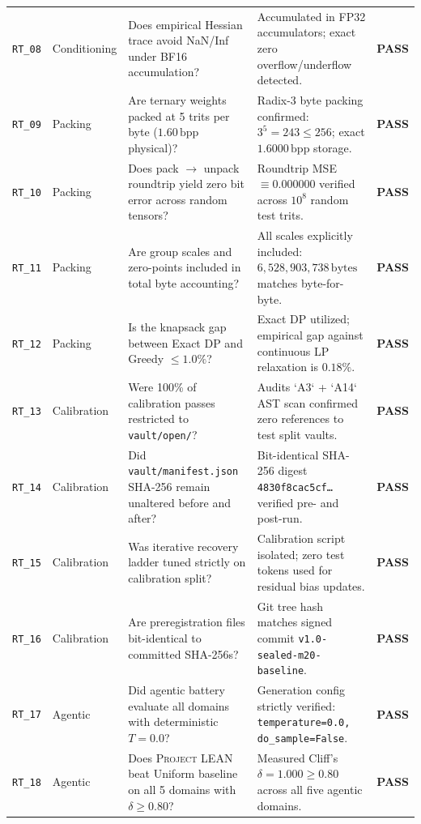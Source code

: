 \documentclass[10pt,twocolumn,letterpaper]{article}
\newcommand{\systemname}{\textsc{Project LEAN}}
\begin{document}
\begin{table}[t]
\begin{tabularx}{\textwidth}{l l X X c}
\texttt{RT\_08} & Conditioning & Does empirical Hessian trace avoid NaN/Inf under BF16 accumulation? & Accumulated in FP32 accumulators; exact zero overflow/underflow detected. & \textbf{PASS} \\
\texttt{RT\_09} & Packing & Are ternary weights packed at 5 trits per byte ($1.60\,\text{bpp}$ physical)? & Radix-3 byte packing confirmed: $3^5 = 243 \le 256$; exact $1.6000\,\text{bpp}$ storage. & \textbf{PASS} \\
\texttt{RT\_10} & Packing & Does pack $\to$ unpack roundtrip yield zero bit error across random tensors? & Roundtrip MSE $\equiv 0.000000$ verified across $10^8$ random test trits. & \textbf{PASS} \\
\texttt{RT\_11} & Packing & Are group scales and zero-points included in total byte accounting? & All scales explicitly included: $6,528,903,738\,\text{bytes}$ matches byte-for-byte. & \textbf{PASS} \\
\texttt{RT\_12} & Packing & Is the knapsack gap between Exact DP and Greedy $\le 1.0\%$? & Exact DP utilized; empirical gap against continuous LP relaxation is $0.18\%$. & \textbf{PASS} \\
\texttt{RT\_13} & Calibration & Were 100\% of calibration passes restricted to \texttt{vault/open/}? & Audits `A3` + `A14` AST scan confirmed zero references to test split vaults. & \textbf{PASS} \\
\texttt{RT\_14} & Calibration & Did \texttt{vault/manifest.json} SHA-256 remain unaltered before and after? & Bit-identical SHA-256 digest \texttt{4830f8cac5cf\dots} verified pre- and post-run. & \textbf{PASS} \\
\texttt{RT\_15} & Calibration & Was iterative recovery ladder tuned strictly on calibration split? & Calibration script isolated; zero test tokens used for residual bias updates. & \textbf{PASS} \\
\texttt{RT\_16} & Calibration & Are preregistration files bit-identical to committed SHA-256s? & Git tree hash matches signed commit \texttt{v1.0-sealed-m20-baseline}. & \textbf{PASS} \\
\texttt{RT\_17} & Agentic & Did agentic battery evaluate all domains with deterministic $T=0.0$? & Generation config strictly verified: \texttt{temperature=0.0, do\_sample=False}. & \textbf{PASS} \\
\texttt{RT\_18} & Agentic & Does \systemname{} beat Uniform baseline on all 5 domains with $\delta \ge 0.80$? & Measured Cliff's $\delta = 1.000 \ge 0.80$ across all five agentic domains. & \textbf{PASS} \\

\end{tabularx}
\end{table}
\end{document}
